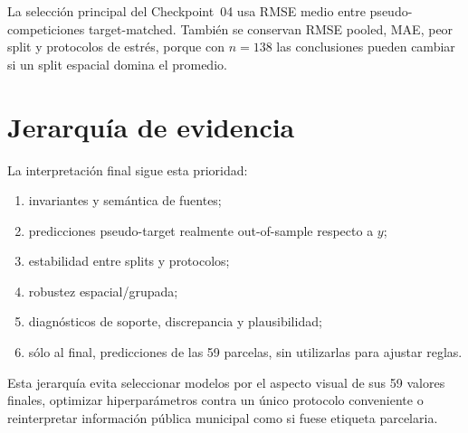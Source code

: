 La selección principal del Checkpoint~04 usa RMSE medio entre pseudo-competiciones
target-matched. También se conservan RMSE pooled, MAE, peor split y protocolos de estrés,
porque con $n=138$ las conclusiones pueden cambiar si un split espacial domina el promedio.

\section*{Jerarquía de evidencia}
La interpretación final sigue esta prioridad:
\begin{enumerate}
\item invariantes y semántica de fuentes;
\item predicciones pseudo-target realmente out-of-sample respecto a $y$;
\item estabilidad entre splits y protocolos;
\item robustez espacial/grupada;
\item diagnósticos de soporte, discrepancia y plausibilidad;
\item sólo al final, predicciones de las 59 parcelas, sin utilizarlas para ajustar reglas.
\end{enumerate}
Esta jerarquía evita seleccionar modelos por el aspecto visual de sus 59 valores finales,
optimizar hiperparámetros contra un único protocolo conveniente o reinterpretar información
pública municipal como si fuese etiqueta parcelaria.
